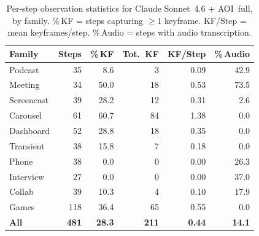 \documentclass[11pt]{article}
\begin{document}
\begin{table}[!h]
\centering
\caption{Per-step observation statistics for Claude Sonnet~4.6 + AOI~full, by
family. \%\,KF = steps capturing $\geq1$ keyframe. KF/Step = mean keyframes/step.
\%\,Audio = steps with audio transcription.}
\label{tab:perstep}
\small
\begin{tabular}{@{}l rrrrr@{}}
\toprule
\textbf{Family} & \textbf{Steps} & \textbf{\%\,KF} & \textbf{Tot.\ KF} & \textbf{KF/Step} & \textbf{\%\,Audio} \\
\midrule
Podcast    & 35 & 8.6 & 3 & 0.09 & 42.9 \\
Meeting    & 34 & 50.0 & 18 & 0.53 & 73.5 \\
Screencast & 39 & 28.2 & 12 & 0.31 & 2.6 \\
Carousel   & 61 & 60.7 & 84 & 1.38 & 0.0 \\
Dashboard  & 52 & 28.8 & 18 & 0.35 & 0.0 \\
Transient  & 38 & 15.8 & 7 & 0.18 & 0.0 \\
Phone      & 38 & 0.0 & 0 & 0.00 & 26.3 \\
Interview  & 27 & 0.0 & 0 & 0.00 & 37.0 \\
Collab     & 39 & 10.3 & 4 & 0.10 & 17.9 \\
Games      & 118 & 36.4 & 65 & 0.55 & 0.0 \\
\midrule
\textbf{All} & \textbf{481} & \textbf{28.3} & \textbf{211} & \textbf{0.44} & \textbf{14.1} \\
\bottomrule
\end{tabular}
\end{table}
\end{document}
